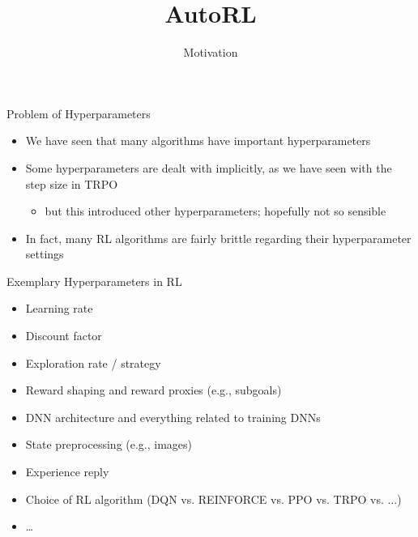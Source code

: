 \documentclass[aspectratio=169]{../latex_main/tntbeamer}  %
\title[AutoRL]{AutoRL}
\subtitle{Motivation}
\begin{document}
	
	\maketitle



\begin{frame}[c]{Problem of Hyperparameters}
	
	\begin{itemize}
	    \item We have seen that many algorithms have important hyperparameters
	    \item Some hyperparameters are dealt with implicitly, as we have seen with the step size in TRPO
	    \begin{itemize}
	        \item but this introduced other hyperparameters; hopefully not so sensible
	    \end{itemize}
	    \item In fact, many RL algorithms are fairly brittle regarding their hyperparameter settings
	\end{itemize}
	
\end{frame}
\begin{frame}[c]{Exemplary Hyperparameters in RL}

        \pause
	\begin{itemize}
	    \item Learning rate
	    \item Discount factor
	    \item Exploration rate / strategy
	    \item Reward shaping and reward proxies (e.g., subgoals)
	    \item DNN architecture and everything related to training DNNs
	    \item State preprocessing (e.g., images)
	    \item Experience reply
	    \item Choice of RL algorithm (DQN vs. REINFORCE vs. PPO vs. TRPO vs. ...)
	    \item \ldots
	\end{itemize}
	
\end{frame}
\end{document}
